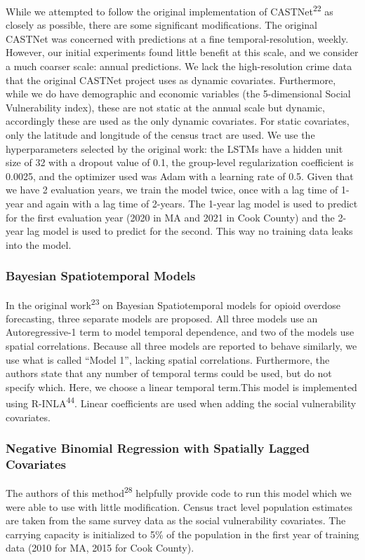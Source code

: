 While we attempted to follow the original implementation of CASTNet\textsuperscript{22} as closely as possible, there are some significant modifications. The original CASTNet was concerned with predictions at a fine temporal-resolution, weekly. However, our initial experiments found little benefit at this scale, and we consider a much coarser scale: annual predictions. We lack the high-resolution crime data that the original CASTNet project uses as dynamic covariates. Furthermore, while we do have demographic and economic variables (the 5-dimensional Social Vulnerability index), these are not static at the annual scale but dynamic, accordingly these are used as the only dynamic covariates. For static covariates, only the latitude and longitude of the census tract are used. We use the hyperparameters selected by the original work: the LSTMs have a hidden unit size of 32 with a dropout value of 0.1, the group-level regularization coefficient is 0.0025, and the optimizer used was Adam with a learning rate of 0.5. Given that we have 2 evaluation years, we train the model twice, once with a lag time of 1-year and again with a lag time of 2-years. The 1-year lag model is used to predict for the first evaluation year (2020 in MA and 2021 in Cook County) and the 2-year lag model is used to predict for the second. This way no training data leaks into the model.

\subsubsection{Bayesian Spatiotemporal Models}\label{bayesian-spatiotemporal-models}

In the original work\textsuperscript{23} on Bayesian Spatiotemporal models for opioid overdose forecasting, three separate models are proposed. All three models use an Autoregressive-1 term to model temporal dependence, and two of the models use spatial correlations. Because all three models are reported to behave similarly, we use what is called ``Model 1'', lacking spatial correlations. Furthermore, the authors state that any number of temporal terms could be used, but do not specify which. Here, we choose a linear temporal term.This model is implemented using R-INLA\textsuperscript{44}. Linear coefficients are used when adding the social vulnerability covariates.

\subsubsection{Negative Binomial Regression with Spatially Lagged Covariates}\label{negative-binomial-regression-with-spatially-lagged-covariates}

The authors of this method\textsuperscript{28} helpfully provide code to run this model which we were able to use with little modification. Census tract level population estimates are taken from the same survey data as the social vulnerability covariates. The carrying capacity is initialized to 5\% of the population in the first year of training data (2010 for MA, 2015 for Cook County).
